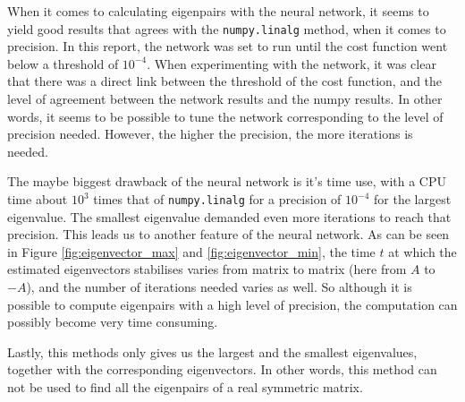 When it comes to calculating eigenpairs with the neural network, it seems to yield good results that agrees with the \texttt{numpy.linalg} method, when it comes to precision. In this report, the network was set to run until the cost function went below a threshold of $10^{-4}$. When experimenting with the network, it was clear that there was a direct link between the threshold of the cost function, and the level of agreement between the network results and the numpy results. In other words, it seems to be possible to tune the network corresponding to the level of precision needed. However, the higher the precision, the more iterations is needed.

The maybe biggest drawback of the neural network is it's time use, with a CPU time about $10^3$ times that of \texttt{numpy.linalg} for a precision of $10^{-4}$ for the largest eigenvalue. The smallest eigenvalue demanded even more iterations to reach that precision. This leads us to another feature of the neural network. As can be seen in Figure \ref{fig:eigenvector_max} and \ref{fig:eigenvector_min}, the time $t$ at which the estimated eigenvectors stabilises varies from matrix to matrix (here from $A$ to $-A$), and the number of iterations needed varies as well. So although it is possible to compute eigenpairs with a high level of precision, the computation can possibly become very time consuming.

Lastly, this methods only gives us the largest and the smallest eigenvalues, together with the corresponding eigenvectors. In other words, this method can not be used to find all the eigenpairs of a real symmetric matrix.
